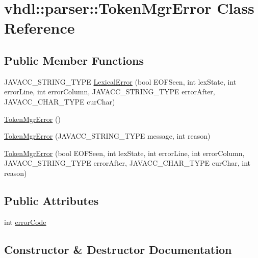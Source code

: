 \hypertarget{classvhdl_1_1parser_1_1_token_mgr_error}{}\section{vhdl\+::parser\+::Token\+Mgr\+Error Class Reference}
\label{classvhdl_1_1parser_1_1_token_mgr_error}
\subsection*{Public Member Functions}
\begin{DoxyCompactItemize}
\item 
J\+A\+V\+A\+C\+C\+\_\+\+S\+T\+R\+I\+N\+G\+\_\+\+T\+Y\+PE \mbox{\hyperlink{classvhdl_1_1parser_1_1_token_mgr_error_af7c34fbde6a8739dd51565cc3b378530}{Lexical\+Error}} (bool E\+O\+F\+Seen, int lex\+State, int error\+Line, int error\+Column, J\+A\+V\+A\+C\+C\+\_\+\+S\+T\+R\+I\+N\+G\+\_\+\+T\+Y\+PE error\+After, J\+A\+V\+A\+C\+C\+\_\+\+C\+H\+A\+R\+\_\+\+T\+Y\+PE cur\+Char)
\item 
\mbox{\hyperlink{classvhdl_1_1parser_1_1_token_mgr_error_a860806ee07d5e8223004cc4dae5386e9}{Token\+Mgr\+Error}} ()
\item 
\mbox{\hyperlink{classvhdl_1_1parser_1_1_token_mgr_error_aa6a0985a512482d5bba1d4a30293570c}{Token\+Mgr\+Error}} (J\+A\+V\+A\+C\+C\+\_\+\+S\+T\+R\+I\+N\+G\+\_\+\+T\+Y\+PE message, int reason)
\item 
\mbox{\hyperlink{classvhdl_1_1parser_1_1_token_mgr_error_abe87f03db721798e75bde8602dc37d1f}{Token\+Mgr\+Error}} (bool E\+O\+F\+Seen, int lex\+State, int error\+Line, int error\+Column, J\+A\+V\+A\+C\+C\+\_\+\+S\+T\+R\+I\+N\+G\+\_\+\+T\+Y\+PE error\+After, J\+A\+V\+A\+C\+C\+\_\+\+C\+H\+A\+R\+\_\+\+T\+Y\+PE cur\+Char, int reason)
\end{DoxyCompactItemize}
\subsection*{Public Attributes}
\begin{DoxyCompactItemize}
\item 
int \mbox{\hyperlink{classvhdl_1_1parser_1_1_token_mgr_error_ac142542be128305d21d59277db52eb93}{error\+Code}}
\end{DoxyCompactItemize}


\subsection{Constructor \& Destructor Documentation}
\mbox{\label{classvhdl_1_1parser_1_1_token_mgr_error_a860806ee07d5e8223004cc4dae5386e9}} 
